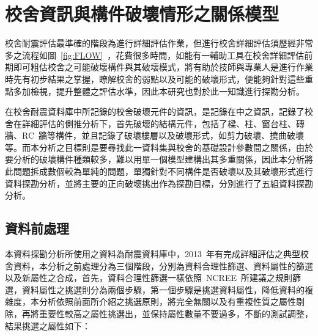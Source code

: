 \renewcommand\thetable{\arabic{chapter}-\arabic{table}}
\chapter{校舍資訊與構件破壞情形之關係模型}
\label{cha:crack} 

校舍耐震評估最準確的階段為進行詳細評估作業，但進行校舍詳細評估須歷經非常多之流程如圖~\ref{fig:FLOW}~，花費很多時間，如能有一輔助工具在校舍詳細評估前期即可粗估校舍之可能破壞構件與其破壞模式，將有助於技師與專業人是進行作業時先有初步結果之掌握，瞭解校舍的弱點以及可能的破壞形式，便能夠針對這些重點多加檢視，提升整體之評估水準，因此本研究也對於此一知識進行探勘分析。

在校舍耐震資料庫中所記錄的校舍破壞元件的資訊，是記錄在中之資訊，記錄了校舍在詳細評估的側推分析下，首先破壞的結構元件，包括了樑、柱、窗台柱、磚牆、RC~牆等構件，並且記錄了破壞樓層以及破壞形式，如剪力破壞、撓曲破壞等。而本分析之目標則是要尋找此一資料集與校舍的基礎設計參數間之關係，由於要分析的破壞構件種類較多，難以用單一個模型建構出其多重關係，因此本分析將此問題拆成數個較為單純的問題，單獨針對不同構件是否破壞以及其破壞形式進行資料探勘分析，並將主要的正向破壞挑出作為探勘目標，分別進行了五組資料探勘分析。


\section{資料前處理}

本資料探勘分析所使用之資料為耐震資料庫中，2013~年有完成詳細評估之典型校舍資料，本分析之前處理分為三個階段，分別為資料合理性篩選、資料屬性的篩選以及新屬性之合成，首先，資料合理性篩選一樣依照~NCREE~所建議之規則篩選，資料屬性之挑選則分為兩個步驟，第一個步驟是挑選資料屬性，降低資料的複雜度，本分析依照前面所介紹之挑選原則，將完全無關以及有重複性質之屬性剔除，再將重要性較高之屬性挑選出，並保持屬性數量不要過多，不斷的測試調整，結果挑選之屬性如下：

